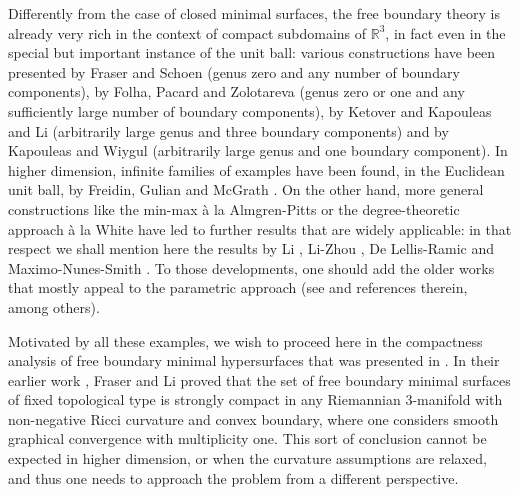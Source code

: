 \documentclass[10pt]{amsart}
\newcounter{cas}
\theoremstyle{definition}
\newcommand{\R}{\mathbb{R}}
\begin{document}
Differently from the case of closed minimal surfaces, the free boundary theory is already very rich in the context of compact subdomains of $\R^3$, in fact even in the special but important instance of the unit ball: various constructions have been presented by Fraser and Schoen \cite{FS16} (genus zero and any number of boundary components), by Folha, Pacard and Zolotareva \cite{FPZ15} (genus zero or one and any sufficiently large number of boundary components), by Ketover \cite{Ket16A} and Kapouleas and Li \cite{KL17} (arbitrarily large genus and three boundary components) and by Kapouleas and Wiygul \cite{KW17} (arbitrarily large genus and one boundary component). In higher dimension, infinite families of examples have been found, in the Euclidean unit ball, by Freidin, Gulian and McGrath \cite{FGM16}. On the other hand, more general constructions like the min-max à la Almgren-Pitts or the degree-theoretic approach à la White have led to further results that are widely applicable: in that respect we shall mention here the results by Li \cite{Li15}, Li-Zhou \cite{LZ16B}, De Lellis-Ramic \cite{DR16} and Maximo-Nunes-Smith \cite{MNS13}. To those developments, one should add the older works that mostly appeal to the parametric approach (see \cite{Cou40, Cou50, Str84, GJ86A, Jo86, Jo86b, Jo87, Wan99, Fra00} and references therein, among others).

Motivated by all these examples, we wish to proceed here in the compactness analysis of free boundary minimal hypersurfaces that was presented in \cite{ACS17}. In their earlier work \cite{FL14}, Fraser and Li proved that the set of free boundary minimal surfaces of fixed topological type is strongly compact in any Riemannian 3-manifold with non-negative Ricci curvature and convex boundary, where one considers smooth graphical convergence with multiplicity one. This sort of conclusion cannot be expected in higher dimension, or when the curvature assumptions are relaxed, and thus one needs to approach the problem from a different perspective. 
\end{document}

